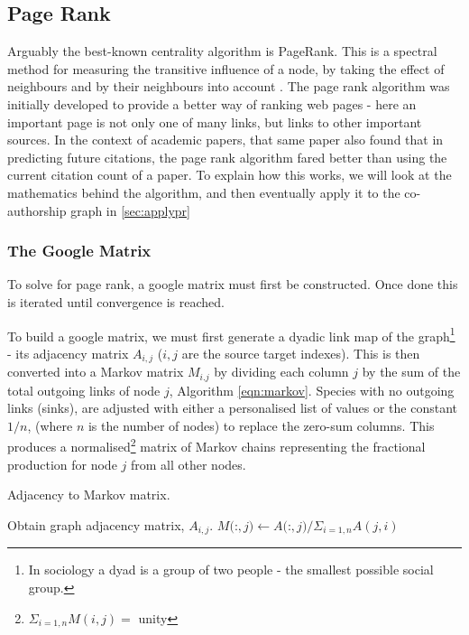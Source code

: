      
% 
% 






\subsection{Page Rank}\label{sec:pagerank}
Arguably the best-known centrality algorithm is PageRank. This is a spectral method for measuring the transitive influence of a node, by taking the effect of neighbours and by their neighbours into account \citep{neoj4}. The page rank algorithm was initially developed to provide a better way of ranking web pages \citep{google}- here an important page is not only one of many links, but links to other important sources. In the context of academic papers, that same paper also found that in predicting future citations, the page rank algorithm fared better than using the current citation count of a paper. 
To explain how this works, we will look at the mathematics behind the algorithm, and then eventually apply it to the co-authorship graph in \autoref{sec:applypr}

\subsubsection{The Google Matrix}
To solve for page rank, a google matrix must first be constructed. Once done this is iterated until convergence is reached. 

To build a google matrix, we must first generate a dyadic link map of the graph\footnote{In sociology a dyad is a group of two people - the smallest possible social group.} - its adjacency matrix $A_{i,j}$ ($i,j$ are the source target indexes). This is then converted into a Markov matrix $M_{i.j}$ by dividing each column $j$ by the sum of the total outgoing links of node $j$, Algorithm \ref{eqn:markov}.
Species with no outgoing links (sinks), are adjusted with either a personalised list of values or the constant $1/n$, (where $n$ is the number of nodes) to replace the zero-sum columns. This produces a normalised\footnote{ \: $\Sigma_{i=1,n} M(i,j) = $ unity} matrix of Markov chains representing the fractional production for node $j$ from all other nodes.

\begin{algorithm} \caption{Adjacency to Markov matrix.}
\begin{algorithmic}[1]
\State Obtain graph adjacency matrix, $A_{i,j}$.
\Repeat
{}
\State $M($:$,j) \gets A($:$,j) / \Sigma_{i=1,n} A(j,i)$
\EndFor
{}

\end{algorithmic}\label{eqn:markov}
\end{algorithm}



